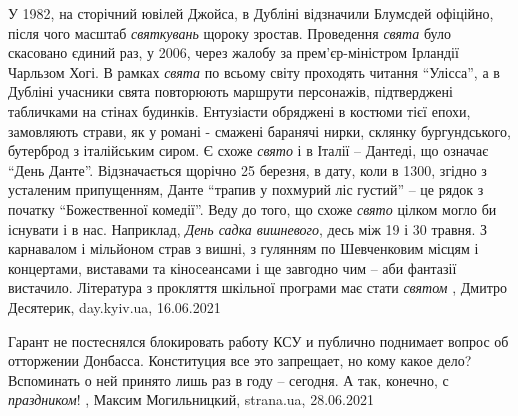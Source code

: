 У 1982, на сторічний ювілей Джойса, в Дубліні відзначили Блумсдей офіційно,
після чого масштаб \emph{святкувань} щороку зростав. Проведення \emph{свята} було скасовано
єдиний раз, у 2006, через жалобу за прем'єр-міністром Ірландії Чарльзом Хогі.
В рамках \emph{свята} по всьому світу проходять читання \enquote{Улісса}, а в Дубліні учасники
свята повторюють маршрути персонажів, підтверджені табличками на стінах
будинків. Ентузіасти обряджені в костюми тієї епохи, замовляють страви, як у
романі - смажені баранячі нирки, склянку бургундського, бутерброд з італійським
сиром.  Є схоже \emph{свято} і в Італії – Дантеді, що означає \enquote{День Данте}.
Відзначається щорічно 25 березня, в дату, коли в 1300, згідно з усталеним
припущенням, Данте \enquote{трапив у похмурий ліс густий} – це рядок з початку
\enquote{Божественної комедії}.  Веду до того, що схоже \emph{свято} цілком могло би існувати
і в нас. Наприклад, \emph{День садка вишневого}, десь між 19 і 30 травня. З карнавалом
і мільйоном страв з вишні, з гулянням по Шевченковим місцям і концертами,
виставами та кіносеансами і ще завгодно чим – аби фантазії вистачило.
Література з прокляття шкільної програми має стати \emph{святом}
, 
Дмитро Десятерик, day.kyiv.ua, 16.06.2021

Гарант не постеснялся блокировать работу КСУ и публично поднимает вопрос об
отторжении Донбасса. Конституция все это запрещает, но кому какое дело?
Вспоминать о ней принято лишь раз в году – сегодня. А так, конечно, с
\emph{праздником}!
, 
Максим Могильницкий, strana.ua, 28.06.2021
